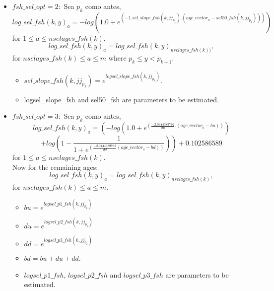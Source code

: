 \documentclass{article}
\begin{document}
\begin{itemize}
\item $fsh\_sel\_opt=2:$ 
Sea $p_k$ como antes, 
\begin{equation}
            log\_sel\_fsh(k,y)_a=-log( 1.0 + e^{(-1.sel\_slope\_fsh(k,jj_{p_k}) . ( age\_vector_a - sel50\_fsh(k,jj_{p_k})) )})
        \end{equation}
        for $1\leq a \leq nselages\_fsh(k)$.
        \begin{equation}
            log\_sel\_fsh(k,y)_a=log\_sel\_fsh(k,y)_{nselages\_fsh(k))},
        \end{equation}
        for $nselages\_fsh(k) \leq a \leq m$ where $p_k\leq y < p_{k+1}$.
        \begin{itemize}
            \item $sel\_slope\_fsh(k,jj_{p_k}) = e^{logsel\_slope\_fsh(k,jj_{p_k})}$.
            \item logsel\_slope\_fsh and sel50\_fsh are parameters to be estimated.
        \end{itemize}
\item $fsh\_sel\_opt=3:$ Sea $p_k$ como antes,
 \begin{equation}
        log\_sel\_fsh(k,y)_a     = \left( -log(1.0 + e^{(\frac{-2.9444389792}{du}.( age\_vector_a - bu) )}) \right.
    \end{equation}
    \begin{equation*}
         \left.+log\left(1 - \dfrac{1}{1 + e^{(\frac{-2.9444389792}{dd} ( age\_vector_a - bd))}} \right) \right)+0.102586589 
    \end{equation*}
      for $1\leq a \leq nselages\_fsh(k)$.\\
      Now for the remaining ages:
    \begin{equation}
        log\_sel\_fsh(k,y)_a = log\_sel\_fsh(k,y)_{nselages\_fsh(k)},
    \end{equation}
    for $nselages\_fsh(k)\leq a \leq m$.
    \begin{itemize}
        \item %
        $bu = e^{logsel\_p1\_fsh(k,jj_{p_k})}$
        \item 
        $du = e^{logsel\_p2\_fsh(k,jj_{p_k})}$
        \item
        $dd = e^{logsel\_p3\_fsh(k,jj_{p_k})}$
        \item $bd = bu + du + dd$.
        \item $logsel\_p1\_fsh$, $logsel\_p2\_fsh$ and $logsel\_p3\_fsh$ are parameters to be estimated.
    \end{itemize}
    
    \end{itemize}
\end{document}
